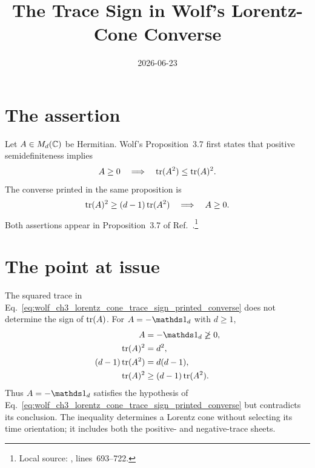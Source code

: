 \documentclass{article}
\title{The Trace Sign in Wolf's Lorentz-Cone Converse}
\author{}
\date{2026-06-23}
\begin{document}
\maketitle
{}

\section{The assertion}

Let $A\in M_{d}(\mathbb{C})$ be Hermitian. Wolf's Proposition~3.7 first states that
positive semidefiniteness implies
\begin{align}
    A\geq 0
    \quad\Longrightarrow\quad
    \operatorname{tr}(A^2)\leq\operatorname{tr}(A)^2.
    \label{eq:wolf_ch3_lorentz_cone_trace_sign_forward_inequality}
\end{align}
The converse printed in the same proposition is
\begin{align}
    \operatorname{tr}(A)^2\geq(d-1)\operatorname{tr}(A^2)
    \quad\Longrightarrow\quad
    A\geq 0.
    \label{eq:wolf_ch3_lorentz_cone_trace_sign_printed_converse}
\end{align}
Both assertions appear in Proposition~3.7 of
Ref.~\cite{Wolf2012Quantum}.\footnote{Local source:
,
lines~693--722.}

\section{The point at issue}

The squared trace in
Eq.~\ref{eq:wolf_ch3_lorentz_cone_trace_sign_printed_converse} does not
determine the sign of $\operatorname{tr}(A)$. For $A=-\Id_d$ with $d\geq 1$,
\begin{align}
    A&=-\Id_d\not\geq 0,
    \label{eq:wolf_ch3_lorentz_cone_trace_sign_negative_identity_not_positive}\\
    \tr(A)^2
        &=d^2,
    \label{eq:wolf_ch3_lorentz_cone_trace_sign_negative_identity_trace_square}\\
    (d-1)\tr(A^2)
        &=d(d-1),
    \label{eq:wolf_ch3_lorentz_cone_trace_sign_negative_identity_square_trace}\\
    \tr(A)^2
        &\geq(d-1)\tr(A^2).
    \label{eq:wolf_ch3_lorentz_cone_trace_sign_negative_identity_satisfies_inequality}
\end{align}
Thus $A=-\Id_d$ satisfies the hypothesis of
Eq.~\ref{eq:wolf_ch3_lorentz_cone_trace_sign_printed_converse} but contradicts
its conclusion. The inequality determines a Lorentz cone without selecting
its time orientation; it includes both the positive- and negative-trace
sheets.
\end{document}
